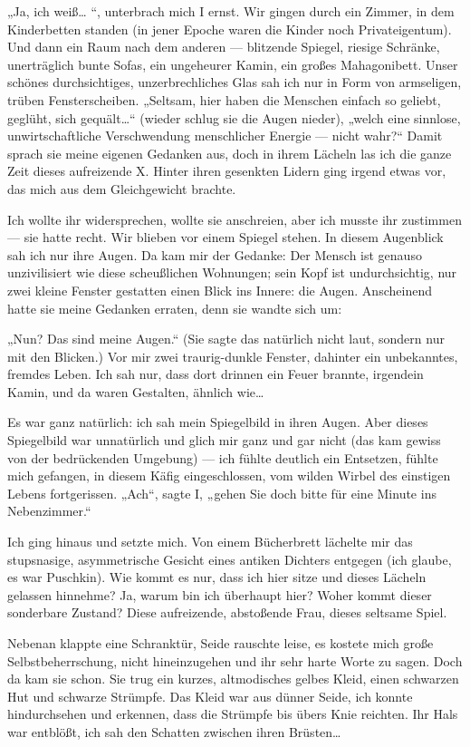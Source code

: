 „Ja, ich weiß\ldots{} “, unterbrach mich I ernst. Wir gingen durch ein
Zimmer, in dem Kinderbetten standen (in jener Epoche waren die
Kinder noch Privateigentum). Und dann ein Raum nach dem anderen —
blitzende Spiegel, riesige Schränke, unerträglich bunte Sofas, ein
ungeheurer Kamin, ein großes Mahagonibett. Unser schönes
durchsichtiges, unzerbrechliches Glas sah ich nur in Form von
armseligen, trüben Fensterscheiben. „Seltsam, hier haben die
Menschen \glq{}einfach so\grq{} geliebt, geglüht, sich
gequält\ldots{}“ (wieder schlug sie die Augen nieder), „welch eine
sinnlose, unwirtschaftliche Verschwendung menschlicher Energie —
nicht wahr?“ Damit sprach sie meine eigenen Gedanken aus, doch in
ihrem Lächeln las ich die ganze Zeit dieses aufreizende X. Hinter
ihren gesenkten Lidern ging irgend etwas vor, das mich aus dem
Gleichgewicht brachte.

Ich wollte ihr widersprechen, wollte sie anschreien, aber ich
musste ihr zustimmen — sie hatte recht. Wir blieben vor einem
Spiegel stehen. In diesem Augenblick sah ich nur ihre Augen. Da kam
mir der Gedanke: Der Mensch ist genauso unzivilisiert wie diese
scheußlichen Wohnungen; sein Kopf ist undurchsichtig, nur zwei
kleine Fenster gestatten einen Blick ins Innere: die Augen.
Anscheinend hatte sie meine Gedanken erraten, denn sie wandte sich
um:

„Nun? Das sind meine Augen.“ (Sie sagte das natürlich nicht laut,
sondern nur mit den Blicken.) Vor mir zwei traurig-dunkle Fenster,
dahinter ein unbekanntes, fremdes Leben. Ich sah nur, dass dort
drinnen ein Feuer brannte, irgendein Kamin, und da waren Gestalten,
ähnlich wie\ldots{}

Es war ganz natürlich: ich sah mein Spiegelbild in ihren Augen.
Aber dieses Spiegelbild war unnatürlich und glich mir ganz und gar
nicht (das kam gewiss von der bedrückenden Umgebung) — ich fühlte
deutlich ein Entsetzen, fühlte mich gefangen, in diesem Käfig
eingeschlossen, vom wilden Wirbel des einstigen Lebens
fortgerissen. „Ach“, sagte I, „gehen Sie doch bitte für eine Minute
ins Nebenzimmer.“

Ich ging hinaus und setzte mich. Von einem Bücherbrett lächelte mir
das stupsnasige, asymmetrische Gesicht eines antiken Dichters
entgegen (ich glaube, es war Puschkin). Wie kommt es nur, dass ich
hier sitze und dieses Lächeln gelassen hinnehme? Ja, warum bin ich
überhaupt hier? Woher kommt dieser sonderbare Zustand? Diese
aufreizende, abstoßende Frau, dieses seltsame Spiel.

Nebenan klappte eine Schranktür, Seide rauschte leise, es kostete
mich große Selbstbeherrschung, nicht hineinzugehen und ihr sehr
harte Worte zu sagen. Doch da kam sie schon. Sie trug ein kurzes,
altmodisches gelbes Kleid, einen schwarzen Hut und schwarze
Strümpfe. Das Kleid war aus dünner Seide, ich konnte hindurchsehen
und erkennen, dass die Strümpfe bis übers Knie reichten. Ihr Hals
war entblößt, ich sah den Schatten zwischen ihren Brüsten\ldots{}

